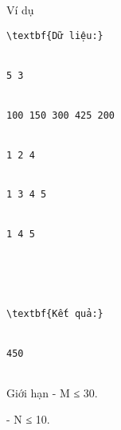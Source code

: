Ví dụ
\begin{verbatim}
\textbf{Dữ liệu:}


5 3


100 150 300 425 200


1 2 4


1 3 4 5


1 4 5





\textbf{Kết quả:}


450


\end{verbatim}
Giới hạn
- M ≤ 30.   


   - N ≤ 10.